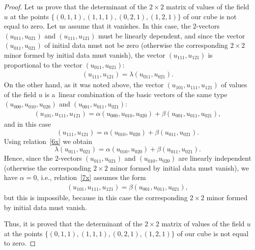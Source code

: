 \begin{proof}
Let us prove that the determinant of the $2 \times 2$ matrix of
values of the f\/ield $u$ at the points $\{(0, 1, 1), (1, 1, 1), (0,
2, 1), (1, 2, 1)\}$ of our cube is not equal to zero. Let us assume
that it va\-nishes. In this case, the $2$-vectors $(u_{0 1 1}, u_{0 2
1})$ and $(u_{1 1 1}, u_{1 2 1})$ must be linearly dependent, and
since the vector $(u_{0 1 1}, u_{0 2 1})$ of initial data must not
be zero (otherwise the corresponding $2 \times 2$ minor formed by
initial data must vanish), the vector $(u_{1 1 1}, u_{1 2 1})$ is
proportional to the vector $(u_{0 1 1}, u_{0 2 1})$: \begin{gather} (u_{1 1 1},
u_{1 2 1}) = \lambda (u_{0 1 1}, u_{0 2 1}). \label{6x} \end{gather} On the
other hand, as it was noted above, the vector $(u_{1 0 1}, u_{1 1
1}, u_{1 2 1})$ of values of the f\/ield $u$ is a~linear combination
of the basic vectors of the same type $(u_{0 0 0}, u_{0 1 0}, u_{0 2
0})$ and $(u_{0 0 1}, u_{0 1 1}, u_{0 2 1})$:
\begin{gather}
(u_{1 0 1}, u_{1 1 1}, u_{1 2 1}) = \alpha (u_{0 0 0}, u_{0 1
0}, u_{0 2 0}) + \beta (u_{0 0 1}, u_{0 1 1}, u_{0 2 1}),
\label{7x}
\end{gather}
and in this case \[ (u_{1 1 1}, u_{1 2 1}) = \alpha (u_{0 1 0},
u_{0 2 0}) + \beta (u_{0 1 1}, u_{0 2 1}). \] Using relation~\eqref{6x}
we obtain \[ \lambda (u_{0 1 1}, u_{0 2 1}) = \alpha
(u_{0 1 0}, u_{0 2 0}) + \beta (u_{0 1 1}, u_{0 2 1}). \] Hence,
since the $2$-vectors $(u_{0 1 1}, u_{0 2 1})$ and $(u_{0 1 0}, u_{0
2 0})$ are linearly independent (otherwise the corresponding $2
\times 2$ minor formed by initial data must vanish), we have $\alpha
= 0$, i.e., relation~\eqref{7x} assumes the form
\begin{gather*} (u_{1 0 1},
u_{1 1 1}, u_{1 2 1}) = \beta (u_{0 0 1}, u_{0 1 1}, u_{0 2 1}),
\end{gather*}
but this is impossible, because in this case the
corresponding $2 \times 2$ minor formed by initial data must vanish.


Thus, it is proved that the determinant of the $2 \times 2$ matrix
of values of the f\/ield $u$ at the points $\{(0, 1, 1), (1, 1, 1),
(0, 2, 1), (1, 2, 1)\}$ of our cube is not equal to zero.





\end{proof}
